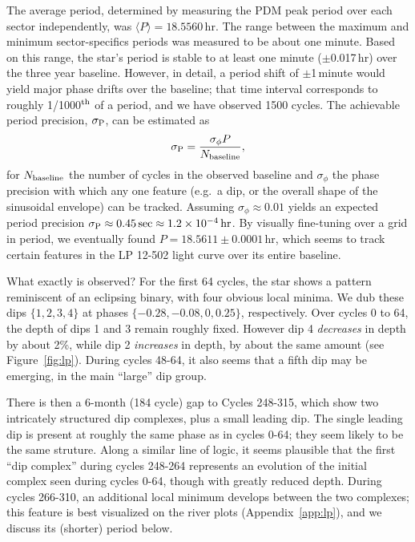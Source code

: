 \documentclass[11pt,twocolumn,tighten]{aastex63}
\begin{document}
The average period, determined by measuring the PDM peak period over
each sector independently, was $\langle P \rangle = 18.5560$\,hr.  The
range between the maximum and minimum sector-specifics periods was
measured to be about one minute.  Based on this range, the star's
period is stable to at least one minute ($\pm$0.017\,hr) over the
three year baseline.  However, in detail, a period shift of
$\pm$1\,minute would yield major phase drifts over the baseline; that
time interval corresponds to roughly 1/1000$^{\rm th}$ of a period,
and we have observed 1500 cycles.  The achievable period precision,
$\sigma_{\rm P}$, can be estimated as
\begin{equation}
  \sigma_{\rm P} = \frac { \sigma_{\phi} P } { N_{\rm baseline} },
\end{equation}
for $N_{\rm baseline}$ the number of cycles in the observed baseline
and $\sigma_{\phi}$ the phase precision with which any one feature
(e.g.~a dip, or the overall shape of the sinusoidal envelope) can be
tracked.  Assuming $\sigma_{\phi} \approx 0.01$ yields an expected
period precision $\sigma_{\rm P} \approx 0.45\,{\rm sec} \approx
1.2\times 10^{-4}\,{\rm hr}$.  By visually fine-tuning over a grid in
period, we eventually found $P=18.5611 \pm 0.0001$\,hr, which seems to
track certain features in the LP 12-502 light curve over its entire
baseline.

What exactly is observed?  For the first 64 cycles, the star shows a
pattern reminiscent of an eclipsing binary, with four obvious local
minima.  We dub these dips $\{ 1, 2, 3, 4 \}$ at phases $\{ -0.28,
-0.08, 0, 0.25 \}$, respectively.  Over cycles 0 to 64, the depth of
dips 1 and 3 remain roughly fixed.  However dip 4 {\it decreases} in
depth by about 2\%, while dip 2 {\it increases} in depth, by about the
same amount (see Figure~\ref{fig:lp}).  During cycles 48-64, it also
seems that a fifth dip may be emerging, in the main ``large'' dip
group.

There is then a 6-month (184 cycle) gap to Cycles 248-315, which show
two intricately structured dip complexes, plus a small leading dip.
The single leading dip is present at roughly the same phase as in
cycles 0-64; they seem likely to be the same struture.  Along a
similar line of logic, it seems plausible that the first ``dip
complex'' during cycles 248-264 represents an evolution of the initial
complex seen during cycles 0-64, though with greatly reduced depth.
During cycles 266-310, an additional local minimum develops between
the two complexes; this feature is best visualized on the river plots
(Appendix~\ref{app:lp}), and we discuss its (shorter) period below.
\end{document}
